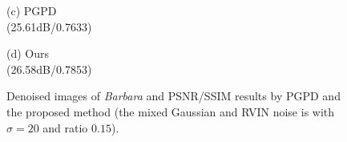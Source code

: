 \documentclass[runningheads]{llncs}
\begin{document}
\begin{figure}
{\begin{minipage}[t]{0.244\textwidth}
{\footnotesize (c) PGPD \\(25.61dB/0.7633)}
\end{minipage}
\begin{minipage}[t]{0.244\textwidth}
\centering
{}
{\footnotesize (d) Ours \\(26.58dB/0.7853)}
\end{minipage}
}
\caption{Denoised images of \textsl{Barbara} and PSNR/SSIM results by PGPD and the proposed method (the mixed Gaussian and RVIN noise is with $\sigma = 20$ and ratio $0.15$).}
\label{fig33}
\end{figure}
\end{document}
